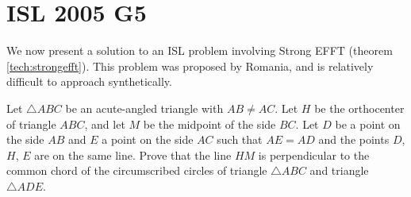 \section{ISL 2005 G5}
\label{exam:2005islg5}
We now present a solution to an ISL problem involving Strong EFFT (theorem \ref{tech:strongefft}).  This problem was proposed by Romania, and is relatively difficult to approach synthetically.

\secps
\begin{problem}[ISL 2005/G5]
  Let $\triangle ABC$ be an acute-angled triangle with $AB \neq AC$. Let $H$ be the orthocenter of triangle $ABC$, and let $M$ be the midpoint of the side $BC$. Let $D$ be a point on the side $AB$ and $E$ a point on the side $AC$ such that $AE=AD$ and the points $D$, $H$, $E$ are on the same line. Prove that the line $HM$ is perpendicular to the common chord of the circumscribed circles of triangle $\triangle ABC$ and triangle $\triangle ADE$.
\end{problem}


